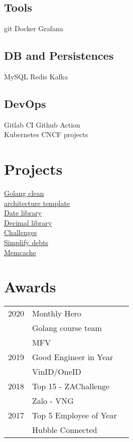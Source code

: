 \documentclass[]{deedy-resume-openfont}
\begin{document}
\begin{minipage}[t]{0.3\textwidth}
\subsection{Tools}
git \textbullet{}  Docker \textbullet{} Grafana
\sectionsep
\subsection{DB and Persistences}
MySQL \textbullet{}  Redis \textbullet{} Kafka
\sectionsep
\subsection{DevOps}
Gitlab CI \textbullet{} Github Action \textbullet{} \\
Kubernetes \textbullet{} CNCF projects
\sectionsep


\section{Projects}
\textbullet{} \href{https://github.com/lovung/GoCleanArchitecture}{ Golang clean \\ architecture template } \\
\textbullet{} \href{https://github.com/lovung/date}{ Date library } \\
\textbullet{} \href{https://github.com/lovung/decimal}{ Decimal library } \\
\textbullet{} \href{https://github.com/lovung/challenges}{ Challenges } \\
\textbullet{} \href{https://github.com/lovung/simplify-debts-demo}{ Simplify debts } \\
\textbullet{} \href{https://github.com/lovung/memcache}{ Memcache } \\


\section{Awards} 
\begin{tabular}{rll}
2020 &  Monthly Hero \\ & Golang course team \\ & MFV \\
2019 & Good Engineer in Year \\ & VinID/OneID \\
2018 & Top 15 - ZAChallenge  \\ & Zalo - VNG \\
2017 & Top 5 Employee of Year \\ & Hubble Connected \\
\end{tabular}
\sectionsep

%
%

\end{minipage} 
\end{document}
